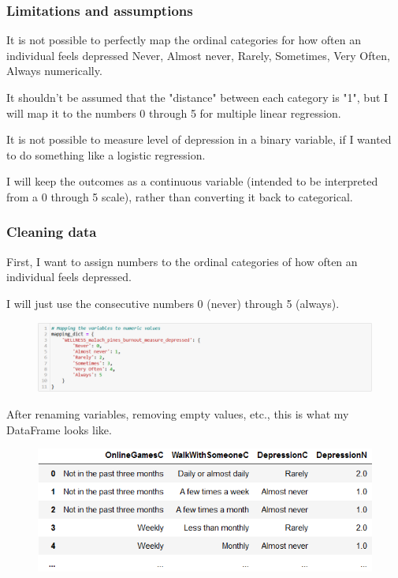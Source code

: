\documentclass{beamer}
\begin{document}
\begin{frame}
    \frametitle{Limitations and assumptions}

    It is not possible to perfectly map the ordinal categories for how often an individual feels depressed {\tiny Never, Almost never, Rarely, Sometimes, Very Often, Always} numerically.

    It shouldn't be assumed that the "distance" between each category is "1", but I will map it to the numbers 0 through 5 for multiple linear regression.

    \vspace{1em}

    It is not possible to measure level of depression in a binary variable, if I wanted to do something like a logistic regression.

    \vspace{1em}

    I will keep the outcomes as a continuous variable (intended to be interpreted from a 0 through 5 scale), rather than converting it back to categorical.

\end{frame}


\begin{frame}
    \frametitle{Cleaning data}

    First, I want to assign numbers to the ordinal categories of how often an individual feels depressed.

    I will just use the consecutive numbers 0 (never) through 5 (always).

    \begin{figure}
        \centering
        \includegraphics[width=0.8\linewidth]{jason_depressionvalues.png}
    \end{figure}

    After renaming variables, removing empty values, etc., this is what my DataFrame looks like.

    \begin{figure}
        \centering
        \includegraphics[width=0.5\linewidth]{jason_dfpreview.png}
    \end{figure}
    
\end{frame}
\end{document}
